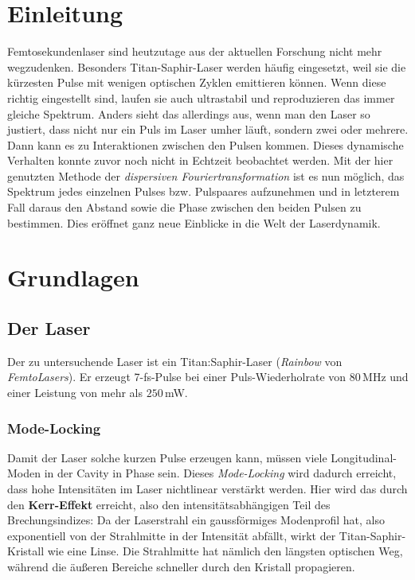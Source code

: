 \documentclass[bachelor,       %
               twoside,        %
               BCOR10mm,       %
               english,ngerman, %
               ]{GAUBM}
\begin{document}
\mainmatter   %

\chapter{Einleitung}
Femtosekundenlaser sind heutzutage aus der aktuellen Forschung nicht mehr wegzudenken.
Besonders Titan-Saphir-Laser werden häufig eingesetzt, weil sie die kürzesten Pulse mit wenigen optischen Zyklen emittieren können.
Wenn diese richtig eingestellt sind, laufen sie auch ultrastabil und reproduzieren das immer gleiche Spektrum.
Anders sieht das allerdings aus, wenn man den Laser so justiert, dass nicht nur ein Puls im Laser umher läuft, sondern zwei oder mehrere.
Dann kann es zu Interaktionen zwischen den Pulsen kommen.
Dieses dynamische Verhalten konnte zuvor noch nicht in Echtzeit beobachtet werden.
Mit der hier genutzten Methode der \textit{dispersiven Fouriertransformation} ist es nun möglich, das Spektrum jedes einzelnen Pulses bzw. Pulspaares aufzunehmen und in letzterem Fall daraus den Abstand sowie die Phase zwischen den beiden Pulsen zu bestimmen.
Dies eröffnet ganz neue Einblicke in die Welt der Laserdynamik.


\chapter{Grundlagen}

\section{Der Laser}
Der zu untersuchende Laser ist ein Titan:Saphir-Laser (\textit{Rainbow} von \textit{FemtoLasers}).
Er erzeugt 7-fs-Pulse bei einer Puls-Wiederholrate von $80\,$MHz und einer Leistung von mehr als $250\,$mW.
\subsection{Mode-Locking}
Damit der Laser solche kurzen Pulse erzeugen kann, müssen viele Longitudinal-Moden in der Cavity in Phase sein.
Dieses \emph{Mode-Locking} wird dadurch erreicht, dass hohe Intensitäten im Laser nichtlinear verstärkt werden.
Hier wird das durch den \textbf{Kerr-Effekt} erreicht, also den intensitätsabhängigen Teil des Brechungsindizes: 
Da der Laserstrahl ein gaussförmiges Modenprofil hat, also exponentiell von der Strahlmitte in der Intensität abfällt, wirkt der Titan-Saphir-Kristall wie eine Linse.
Die Strahlmitte hat nämlich den längsten optischen Weg, während die äußeren Bereiche schneller durch den Kristall propagieren.
\end{document}
